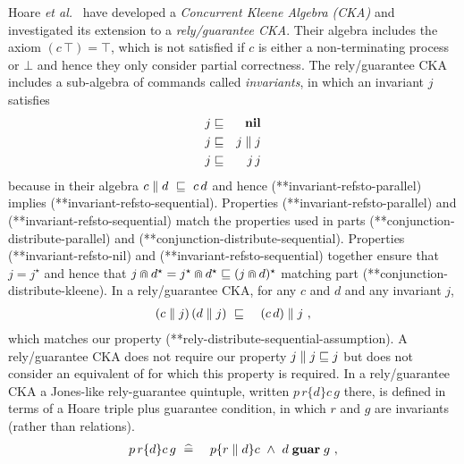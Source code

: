 \documentclass[fleqn]{fac}
\makeatletter
\newcommand{\labelproperty}[1]{\label{property-#1}\index{Property!#1|PropertyDef{\ref{property-#1}}}}
\def\refproperty{\@ifnextchar*{\@refproperty}{\@@refproperty}}
\def\@refproperty*#1{\ref{property-#1}\index{Property!#1|LawUse}}
\def\@@refproperty#1{property~(\ref{property-#1})\index{Property!#1|LawUse}}
\newcommand{\SSeq}{\,}
\newcommand{\Nil}{\Keyword{nil}}
\newcommand{\sdefs}{\mathrel{\widehat=}}\newcommand{\spot}{\mathrel{{\cdot}}}\newcommand{\where}{\mathrel{|}}\renewcommand{\implies}{\mathrel{\Rightarrow}}\newcommand{\emptyrel}{\emptyset}
\newcommand{\together}{\mathbin{\doublecap}}
\newcommand{\Keyword}[1]{\mathsf{\mathbf{#1}}}
\newcommand{\Magic}{\Keyword{\top}}
\newcommand{\Abort}{\Keyword{\bot}}
\newcommand{\FinIter}{^{\star}}
\makeatother
\begin{document}
Hoare {\it et al.}\ \cite{DBLP:journals/jlp/HoareMSW11} have developed a \emph{Concurrent Kleene Algebra (CKA)} 
and investigated its extension to a \emph{rely/guarantee CKA}.
Their algebra includes the axiom $(c \SSeq \Magic) = \Magic$,
which is not satisfied if $c$ is either a non-terminating process or $\Abort$
and hence they only consider partial correctness.
The rely/guarantee CKA includes a sub-algebra of commands called \emph{invariants},
in which an invariant $j$ satisfies
\begin{eqnarray}
  j & \refsto & \Nil \labelproperty{invariant-refsto-nil} \\
  j & \refsto & j \parallel j \labelproperty{invariant-refsto-parallel} \\
  j & \refsto & j \SSeq j \labelproperty{invariant-refsto-sequential}
\end{eqnarray}
because in their algebra $c \parallel d ~\refsto~ c \SSeq d$ and hence 
(\refproperty*{invariant-refsto-parallel}) implies (\refproperty*{invariant-refsto-sequential}).
Properties (\refproperty*{invariant-refsto-parallel}) and (\refproperty*{invariant-refsto-sequential}) match
the properties 
used in  parts (\refproperty*{conjunction-distribute-parallel}) and (\refproperty*{conjunction-distribute-sequential}).
Properties (\refproperty*{invariant-refsto-nil}) and (\refproperty*{invariant-refsto-sequential}) together 
ensure that $j = j\FinIter$ and hence that 
$j \together d\FinIter = j\FinIter \together d\FinIter \refsto (j \together d)\FinIter$
matching  part (\refproperty*{conjunction-distribute-kleene}).
In a rely/guarantee CKA, for any $c$ and $d$ and any invariant $j$, 
\begin{eqnarray*}
  (c \parallel j) \SSeq (d \parallel j) & ~\refsto~ & (c \SSeq d) \parallel j~,
\end{eqnarray*}
which matches our property (\refproperty*{rely-distribute-sequential-assumption}).
A rely/guarantee CKA does not require our property $j \parallel j \mathrel{\sqsubseteq} j$ 
but \cite{DBLP:journals/jlp/HoareMSW11} does not consider an equivalent of 
for which this property is required.
In a rely/guarantee CKA 
a Jones-like rely-guarantee quintuple,
written $p\,r \{ d \} c\,g$ there, 
is defined in terms of a Hoare triple plus guarantee condition,
in which $r$ and $g$ are invariants (rather than relations).
\begin{eqnarray}
  p\,r \{ d\} c\,g & ~\sdefs~ &  p \{ r \parallel d \} c ~\land~d \mathrel{\Keyword{guar}} g~,
    \labelproperty{CKA-rg}
\end{eqnarray}
\end{document}
